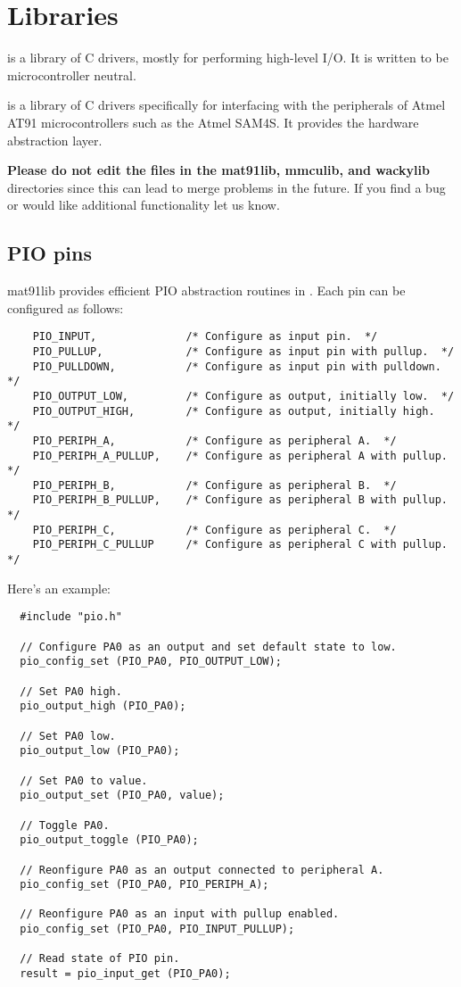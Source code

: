 \chapter{Libraries}

 is a library of C drivers, mostly for performing high-level I/O.
It is written to be microcontroller neutral.

 is a library of C drivers specifically for interfacing
with the peripherals of Atmel AT91 microcontrollers such as the Atmel
SAM4S. It provides the hardware abstraction layer.

\textbf{Please do not edit the files in the mat91lib, mmculib, and
  wackylib} directories since this can lead to merge problems in the
future. If you find a bug or would like additional functionality let
us know.


\section{PIO pins}

mat91lib provides efficient PIO abstraction routines in
.  Each pin can be configured as follows:
%
\begin{verbatim}
    PIO_INPUT,              /* Configure as input pin.  */
    PIO_PULLUP,             /* Configure as input pin with pullup.  */
    PIO_PULLDOWN,           /* Configure as input pin with pulldown.  */
    PIO_OUTPUT_LOW,         /* Configure as output, initially low.  */
    PIO_OUTPUT_HIGH,        /* Configure as output, initially high.  */
    PIO_PERIPH_A,           /* Configure as peripheral A.  */
    PIO_PERIPH_A_PULLUP,    /* Configure as peripheral A with pullup.  */
    PIO_PERIPH_B,           /* Configure as peripheral B.  */
    PIO_PERIPH_B_PULLUP,    /* Configure as peripheral B with pullup.  */
    PIO_PERIPH_C,           /* Configure as peripheral C.  */
    PIO_PERIPH_C_PULLUP     /* Configure as peripheral C with pullup.  */
\end{verbatim}

Here's an example:
%
\begin{verbatim}
  #include "pio.h"

  // Configure PA0 as an output and set default state to low.
  pio_config_set (PIO_PA0, PIO_OUTPUT_LOW);

  // Set PA0 high.
  pio_output_high (PIO_PA0);

  // Set PA0 low.  
  pio_output_low (PIO_PA0);

  // Set PA0 to value.
  pio_output_set (PIO_PA0, value);  

  // Toggle PA0.  
  pio_output_toggle (PIO_PA0);    

  // Reonfigure PA0 as an output connected to peripheral A.
  pio_config_set (PIO_PA0, PIO_PERIPH_A);

  // Reonfigure PA0 as an input with pullup enabled.
  pio_config_set (PIO_PA0, PIO_INPUT_PULLUP);

  // Read state of PIO pin.
  result = pio_input_get (PIO_PA0);
\end{verbatim}

